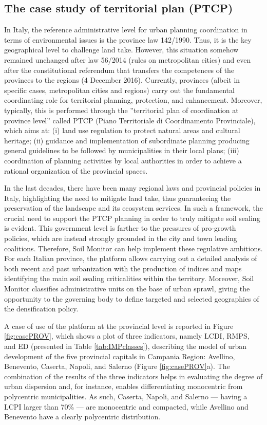 \documentclass[APA,LATO1COL,doublespace]{WileyNJD-v2}
\begin{document}
\subsection{The case study of territorial plan (PTCP)}
In Italy, the reference administrative level for urban planning coordination in terms of environmental issues is the province law 142/1990. 
Thus, it is the key geographical level to challenge land take. 
However, this situation somehow remained unchanged after law 56/2014 (rules on metropolitan cities) and even after the constitutional referendum that transfers the competences of the provinces to the regions (4 December 2016).
Currently, provinces (albeit in specific cases, metropolitan cities and regions) carry out the fundamental coordinating role for territorial planning, protection, and enhancement. 
Moreover, typically, this is performed through the ''territorial plan of coordination at province level'' called PTCP (Piano Territoriale di Coordinamento Provinciale), which aims at: (i) land use regulation to protect natural areas and cultural heritage; (ii) guidance and implementation of subordinate planning producing general guidelines to be followed by municipalities in their local plans; (iii) coordination of planning activities by local authorities in order to achieve a rational organization of the provincial spaces.

In the last decades, there have been many regional laws and provincial policies in Italy, highlighting the need to mitigate land take, thus guaranteeing the preservation of the landscape and its ecosystem services. 
In such a framework, the crucial need to support the PTCP planning in order to truly mitigate soil sealing is evident. 
This government level is farther to the pressures  of pro-growth policies, which are instead strongly grounded in the city and town leading coalitions.
Therefore, Soil Monitor can help implement these regulative ambitions.
For each Italian province, the platform allows carrying out a detailed analysis of both recent and past urbanization with the production of indices and maps identifying the main soil sealing criticalities within the territory.
Moreover, Soil Monitor classifies administrative units on the base of urban sprawl, giving the opportunity to the governing body to define targeted and selected geographies of the densification policy.

A case of use of the platform at the provincial level is reported in Figure \ref{fig:casePROV}, which shows a plot of three indicators, namely LCDI, RMPS, and ED (presented in Table \ref{tab:IMPclasses}), describing the model of urban development of the five provincial capitals in Campania Region: Avellino, Benevento, Caserta, Napoli, and Salerno (Figure \ref{fig:casePROV}a). 
The combination of the results of the three indicators helps in evaluating the degree of urban dispersion and, for instance, enables differentiating monocentric from polycentric municipalities. 
As such, Caserta, Napoli, and Salerno --- having a LCPI larger than 70\% --- are monocentric and compacted, while Avellino and Benevento have a clearly polycentric distribution.
\end{document}
